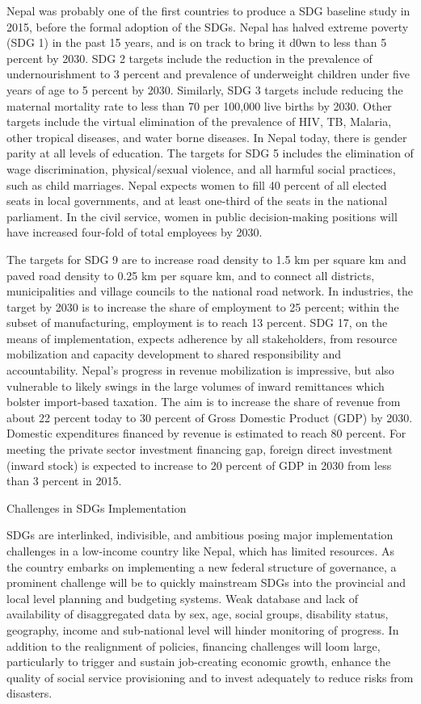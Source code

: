 \documentclass[
  openany]{book}
\begin{document}
Nepal was probably one of the first countries to produce a SDG baseline study in 2015, before the formal adoption of the SDGs. Nepal has halved extreme poverty (SDG 1) in the past 15 years, and is on track to bring it d0wn to less than 5 percent by 2030. SDG 2 targets include the reduction in the prevalence of undernourishment to 3 percent and prevalence of underweight children under five years of age to 5 percent by 2030. Similarly, SDG 3 targets include reducing the maternal mortality rate to less than 70 per 100,000 live births by 2030. Other targets include the virtual elimination of the prevalence of HIV, TB, Malaria, other tropical diseases, and water borne diseases. In Nepal today, there is gender parity at all levels of education. The targets for SDG 5 includes the elimination of wage discrimination, physical/sexual violence, and all harmful social practices, such as child marriages. Nepal expects women to fill 40 percent of all elected seats in local governments, and at least one-third of the seats in the national parliament. In the civil service, women in public decision-making positions will have increased four-fold of total employees by 2030.

The targets for SDG 9 are to increase road density to 1.5 km per square km and paved road density to 0.25 km per square km, and to connect all districts, municipalities and village councils to the national road network. In industries, the target by 2030 is to increase the share of employment to 25 percent; within the subset of manufacturing, employment is to reach 13 percent. SDG 17, on the means of implementation, expects adherence by all stakeholders, from resource mobilization and capacity development to shared responsibility and accountability. Nepal's progress in revenue mobilization is impressive, but also vulnerable to likely swings in the large volumes of inward remittances which bolster import-based taxation. The aim is to increase the share of revenue from about 22 percent today to 30 percent of Gross Domestic Product (GDP) by 2030. Domestic expenditures financed by revenue is estimated to reach 80 percent. For meeting the private sector investment financing gap, foreign direct investment (inward stock) is expected to increase to 20 percent of GDP in 2030 from less than 3 percent in 2015.

Challenges in SDGs Implementation

SDGs are interlinked, indivisible, and ambitious posing major implementation challenges in a low-income country like Nepal, which has limited resources. As the country embarks on implementing a new federal structure of governance, a prominent challenge will be to quickly mainstream SDGs into the provincial and local level planning and budgeting systems. Weak database and lack of availability of disaggregated data by sex, age, social groups, disability status, geography, income and sub-national level will hinder monitoring of progress. In addition to the realignment of policies, financing challenges will loom large, particularly to trigger and sustain job-creating economic growth, enhance the quality of social service provisioning and to invest adequately to reduce risks from disasters.
\end{document}
